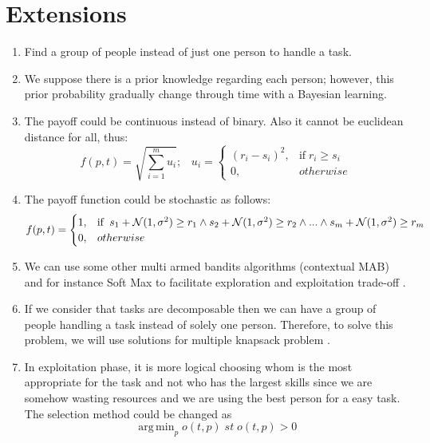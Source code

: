 \documentclass[]{article}
\begin{document}
\section{Extensions}\label{extension}
\begin{enumerate}
	\item Find a group of people instead of just one person to handle a task.
	\item We suppose there is a prior knowledge regarding each person; however, this prior probability gradually change through time with a Bayesian learning.
	\item The payoff could be continuous instead of binary. Also it cannot be euclidean distance for all, thus: 
	\begin{equation}
		f(p,t) = \sqrt{\sum_{i=1}^{m}u_i};\;\;\;
		u_i = 
		\begin{cases}
			(r_i - s_i)^2,	& \text{if}\; r_i \geq s_i\\
			0,	& otherwise
		\end{cases}
	\end{equation}
	\item The payoff function could be stochastic as follows:
	\begin{equation}
		f(p,t) = 
		\begin{cases}
			1,	& \text{if\;\;} s_1 + \mathcal{N}(1,\sigma^2) \geq r_1 \wedge s_2 + \mathcal{N}(1,\sigma^2) \geq r_2 \wedge ... \wedge s_m + \mathcal{N}(1,\sigma^2) \geq r_m\\
			0,	& otherwise
		\end{cases}
	\end{equation}
	\item We can use some other multi armed bandits algorithms (contextual MAB) and for instance Soft Max to facilitate exploration and exploitation trade-off \cite{li2010contextual, kuleshov2014algorithms}.
	\item If we consider that tasks are decomposable then we can have a group of people handling a task instead of solely one person. Therefore, to solve this problem, we will use solutions for multiple knapsack problem \cite{chekuri2005polynomial}.
	\item In exploitation phase, it is more logical choosing whom is the most appropriate for the task and not who has the largest skills since we are somehow wasting resources and we are using the best person for a easy task. The selection method could be changed as
	\begin{equation}
		\operatorname{arg\,min}_p o(t,p)\;st\;o(t,p) > 0

\end{equation}
\end{enumerate}
\end{document}
